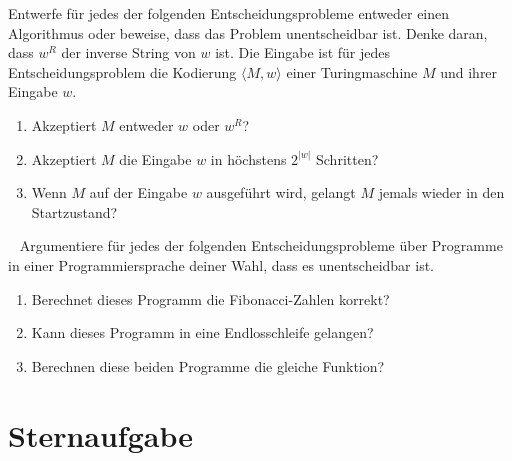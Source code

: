 \documentclass{uebung_cs}
\begin{document}
\begin{aufgabe}[Entscheidbarkeit V]
	Entwerfe für jedes der folgenden Entscheidungsprobleme entweder einen Algorithmus oder beweise, dass das Problem unentscheidbar ist. Denke daran, dass $w^R$ der inverse String von $w$ ist. Die Eingabe ist für jedes Entscheidungsproblem die Kodierung $\langle M,w \rangle$ einer Turingmaschine $M$ und ihrer Eingabe $w$.
	\begin{enumerate}
		\item Akzeptiert $M$ entweder $w$ oder $w^R$?
		\item Akzeptiert $M$ die Eingabe $w$ in höchstens $2^{|w|}$ Schritten?
		\item Wenn $M$ auf der Eingabe $w$ ausgeführt wird, gelangt $M$ jemals wieder in den Startzustand?
	\end{enumerate}
\end{aufgabe}

\begin{aufgabe}[Entscheidbarkeit $-$I]\
	Argumentiere für jedes der folgenden Entscheidungsprobleme über Programme in einer Programmiersprache deiner Wahl, dass es unentscheidbar ist.
	\begin{enumerate}
		\item Berechnet dieses Programm die Fibonacci-Zahlen korrekt?
		\item Kann dieses Programm in eine Endlosschleife gelangen?
		\item Berechnen diese beiden Programme die gleiche Funktion?
	\end{enumerate}
\end{aufgabe}


\section*{Sternaufgabe}

\begin{aufgabe}
  
\end{aufgabe}
\end{document}
